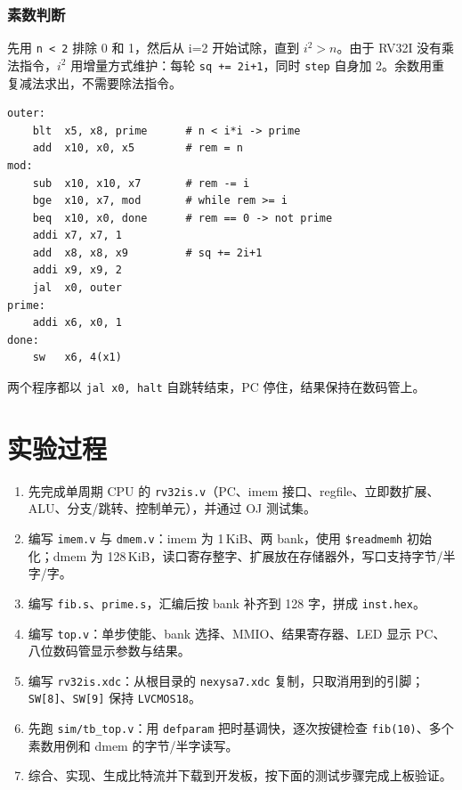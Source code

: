 \documentclass[12pt, a4paper]{ctexart}
\begin{document}
\subsubsection{素数判断}
先用 \texttt{n < 2} 排除 0 和 1，然后从 i=2 开始试除，直到 $i^2 > n$。由于 RV32I 没有乘法指令，$i^2$ 用增量方式维护：每轮 \texttt{sq += 2i+1}，同时 \texttt{step} 自身加 2。余数用重复减法求出，不需要除法指令。

\begin{lstlisting}[language={},numbers=none]
outer:
    blt  x5, x8, prime      # n < i*i -> prime
    add  x10, x0, x5        # rem = n
mod:
    sub  x10, x10, x7       # rem -= i
    bge  x10, x7, mod       # while rem >= i
    beq  x10, x0, done      # rem == 0 -> not prime
    addi x7, x7, 1
    add  x8, x8, x9         # sq += 2i+1
    addi x9, x9, 2
    jal  x0, outer
prime:
    addi x6, x0, 1
done:
    sw   x6, 4(x1)
\end{lstlisting}

\noindent 两个程序都以 \texttt{jal x0, halt} 自跳转结束，PC 停住，结果保持在数码管上。

\section{实验过程}
\begin{enumerate}
    \item 先完成单周期 CPU 的 \texttt{rv32is.v}（PC、imem 接口、regfile、立即数扩展、ALU、分支/跳转、控制单元），并通过 OJ 测试集。
    \item 编写 \texttt{imem.v} 与 \texttt{dmem.v}：imem 为 1\,KiB、两 bank，使用 \texttt{\$readmemh} 初始化；dmem 为 128\,KiB，读口寄存整字、扩展放在存储器外，写口支持字节/半字/字。
    \item 编写 \texttt{fib.s}、\texttt{prime.s}，汇编后按 bank 补齐到 128 字，拼成 \texttt{inst.hex}。
    \item 编写 \texttt{top.v}：单步使能、bank 选择、MMIO、结果寄存器、LED 显示 PC、八位数码管显示参数与结果。
    \item 编写 \texttt{rv32is.xdc}：从根目录的 \texttt{nexysa7.xdc} 复制，只取消用到的引脚；\texttt{SW[8]}、\texttt{SW[9]} 保持 \texttt{LVCMOS18}。
    \item 先跑 \texttt{sim/tb\_top.v}：用 \texttt{defparam} 把时基调快，逐次按键检查 \texttt{fib(10)}、多个素数用例和 dmem 的字节/半字读写。
    \item 综合、实现、生成比特流并下载到开发板，按下面的测试步骤完成上板验证。
\end{enumerate}
\end{document}
